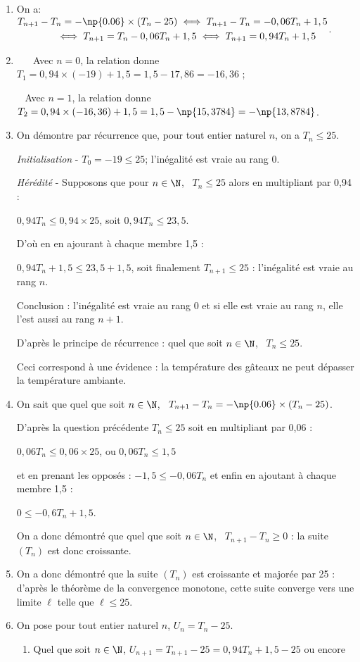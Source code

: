\begin{enumerate}
\item 
On a: $\begin{gathered}T_{n+1}-T_n=-\np{0.06}\times \left(T_n - 25\right) \iff T_{n+1}-T_n = -0,06T_n  + 1,5 \\
\hspace*{1cm}\iff T_{n+1} =  T_n - 0,06T_n  + 1,5 \iff T_{n+1} =  0,94T_n  + 1,5\end{gathered}$.
\item ~
\starredbullet ~ Avec $n = 0$, la relation  donne $T_1 = 0,94 \times (- 19) + 1,5 = 1,5 - 17,86 = -16,36$ ;

\starredbullet ~ Avec $n = 1$, la relation  donne $T_2 = 0,94 \times (- 16,36) + 1,5 = 1,5 - \np{15,3784} = -\np{13,8784}$.
\item On démontre par récurrence que, pour tout entier naturel $n$, on a $T_n\leqslant 25$.


\emph{Initialisation} - $T_0 = - 19 \leqslant 25$; l'inégalité est vraie au rang $0$.

\emph{Hérédité} - Supposons que pour $n \in \N$, \, $T_n\leqslant 25$ alors en multipliant par 0,94 :

$0,94T_n \leqslant 0,94 \times 25$, soit $0,94T_n \leqslant  23,5$.

D'où en en ajourant à chaque membre 1,5 :

$0,94T_n  + 1,5 \leqslant 23,5 + 1,5$, soit finalement $T_{n+1} \leqslant 25$ : l'inégalité est vraie au rang $n$.

Conclusion : l'inégalité est vraie au rang $0$ et si elle est vraie au rang $n$, elle l'est aussi au rang $n + 1$.

D'après le principe de récurrence : quel que soit $n \in \N$, \, $T_n \leqslant 25$.

Ceci correspond à une évidence : la température des gâteaux ne peut dépasser la température ambiante.
\item 
On sait que quel que soit $n \in \N$, \, $T_{n+1}-T_n = -\np{0.06}\times \left(T_n - 25\right)$.

D'après la question précédente $T_n \leqslant 25$ soit en multipliant par 0,06 :

$0,06T_n \leqslant 0,06 \times 25$, ou $0,06T_n \leqslant 1,5$

et en prenant les opposés : $- 1,5 \leqslant - 0,06T_n$ et enfin en ajoutant à chaque membre 1,5 :

$0 \leqslant - 0,6T_n + 1,5$.

On a donc démontré que quel que soit $n \in \N$, \, $T_{n+1}-T_n  \geqslant 0$ : la suite $\left(T_n\right)$ est donc croissante.
\item 
On a donc démontré que la suite $\left(T_n\right)$ est croissante et majorée par 25 : d'après le théorème de la convergence monotone, cette suite converge vers une limite $\ell$ telle que $\ell \leqslant 25$.
\item On pose pour tout entier naturel $n$, $U_n = T_n - 25$.
\begin{enumerate}
\item 
Quel que soit $n \in \N$, $U_{n+1} = T_{n+1} - 25 = 0,94T_n + 1,5 - 25$ ou encore 


\end{enumerate}
\end{enumerate}
